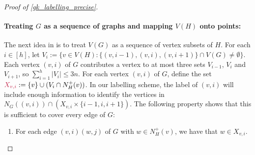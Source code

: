 \documentclass{patmorin}
\makeatletter
\renewcommand{\le}{\leqslant}
\def\mathcolor#1#{\@mathcolor{#1}}
\def\@mathcolor#1#2#3{%
  \protect\leavevmode
  \begingroup
    \color#1{#2}#3%
  \endgroup
}
\newcommand{\mathdefin}[1]{\mathcolor{brightmaroon}{#1}}
\makeatother
\begin{document}
\begin{proof}[Proof of \cref{gk_labelling_precise}]
  \paragraph{\boldmath Treating $G$ as a sequence of graphs and mapping $V(H)$ onto points:}
  The next idea in \cite{dujmovic.esperet.ea:adjacency} is to treat $V(G)$ as a sequence of vertex subsets of $H$.
  For each $i\in[h]$, let $V_i:=\{v\in V(H): \{(v,i-1),(v,i),(v,i+1)\}\cap V(G)\neq\emptyset \}$.    Each vertex $(v,i)$ of $G$ contributes a vertex to at most three sets $V_{i-1}$, $V_{i}$ and $V_{i+1}$, so $\sum_{i=1}^h |V_i|\le 3n$.  For each vertex $(v,i)$ of $G$, define the set $\mathdefin{X_{v,i}}:= \{v\}\cup (V_i\cap N^+_H(v))$.  In our labelling scheme, the label of $(v,i)$ will include enough information to identify the vertices in $N_G((v,i))\cap (X_{v,i}\times\{i-1,i,i+1\})$.  The following property shows that this is sufficient to cover every edge of $G$:
  \begin{enumerate}[label=(Q\arabic*),nosep,nolistsep]
    \item \label{obs:x_v_i_sufficient}
      For each edge $(v,i)(w,j)$ of $G$ with $w\in N^+_H(v)$, we have that $w\in X_{v,i}$.
  \end{enumerate}


\end{proof}
\end{document}
